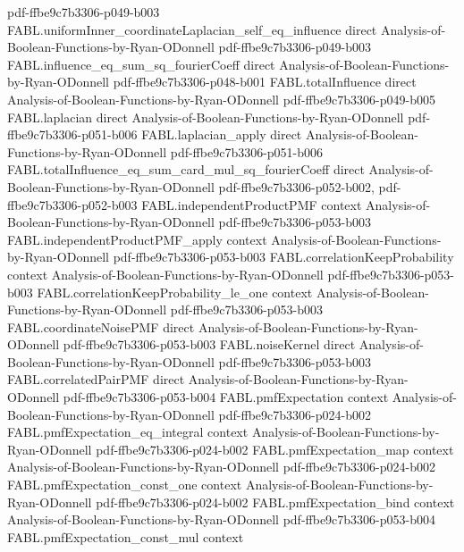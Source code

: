 \begin{theorem}
  {pdf-ffbe9c7b3306-p049-b003}
\proofstep
  {FABL.uniformInner_coordinateLaplacian_self_eq_influence}
  {direct}
  {Analysis-of-Boolean-Functions-by-Ryan-ODonnell}
  {pdf-ffbe9c7b3306-p049-b003}
\proofstep
  {FABL.influence_eq_sum_sq_fourierCoeff}
  {direct}
  {Analysis-of-Boolean-Functions-by-Ryan-ODonnell}
  {pdf-ffbe9c7b3306-p048-b001}
\proofstep
  {FABL.totalInfluence}
  {direct}
  {Analysis-of-Boolean-Functions-by-Ryan-ODonnell}
  {pdf-ffbe9c7b3306-p049-b005}
\proofstep
  {FABL.laplacian}
  {direct}
  {Analysis-of-Boolean-Functions-by-Ryan-ODonnell}
  {pdf-ffbe9c7b3306-p051-b006}
\proofstep
  {FABL.laplacian_apply}
  {direct}
  {Analysis-of-Boolean-Functions-by-Ryan-ODonnell}
  {pdf-ffbe9c7b3306-p051-b006}
\proofstep
  {FABL.totalInfluence_eq_sum_card_mul_sq_fourierCoeff}
  {direct}
  {Analysis-of-Boolean-Functions-by-Ryan-ODonnell}
  {pdf-ffbe9c7b3306-p052-b002,
    pdf-ffbe9c7b3306-p052-b003}
\proofstep
  {FABL.independentProductPMF}
  {context}
  {Analysis-of-Boolean-Functions-by-Ryan-ODonnell}
  {pdf-ffbe9c7b3306-p053-b003}
\proofstep
  {FABL.independentProductPMF_apply}
  {context}
  {Analysis-of-Boolean-Functions-by-Ryan-ODonnell}
  {pdf-ffbe9c7b3306-p053-b003}
\proofstep
  {FABL.correlationKeepProbability}
  {context}
  {Analysis-of-Boolean-Functions-by-Ryan-ODonnell}
  {pdf-ffbe9c7b3306-p053-b003}
\proofstep
  {FABL.correlationKeepProbability_le_one}
  {context}
  {Analysis-of-Boolean-Functions-by-Ryan-ODonnell}
  {pdf-ffbe9c7b3306-p053-b003}
\proofstep
  {FABL.coordinateNoisePMF}
  {direct}
  {Analysis-of-Boolean-Functions-by-Ryan-ODonnell}
  {pdf-ffbe9c7b3306-p053-b003}
\proofstep
  {FABL.noiseKernel}
  {direct}
  {Analysis-of-Boolean-Functions-by-Ryan-ODonnell}
  {pdf-ffbe9c7b3306-p053-b003}
\proofstep
  {FABL.correlatedPairPMF}
  {direct}
  {Analysis-of-Boolean-Functions-by-Ryan-ODonnell}
  {pdf-ffbe9c7b3306-p053-b004}
\proofstep
  {FABL.pmfExpectation}
  {context}
  {Analysis-of-Boolean-Functions-by-Ryan-ODonnell}
  {pdf-ffbe9c7b3306-p024-b002}
\proofstep
  {FABL.pmfExpectation_eq_integral}
  {context}
  {Analysis-of-Boolean-Functions-by-Ryan-ODonnell}
  {pdf-ffbe9c7b3306-p024-b002}
\proofstep
  {FABL.pmfExpectation_map}
  {context}
  {Analysis-of-Boolean-Functions-by-Ryan-ODonnell}
  {pdf-ffbe9c7b3306-p024-b002}
\proofstep
  {FABL.pmfExpectation_const_one}
  {context}
  {Analysis-of-Boolean-Functions-by-Ryan-ODonnell}
  {pdf-ffbe9c7b3306-p024-b002}
\proofstep
  {FABL.pmfExpectation_bind}
  {context}
  {Analysis-of-Boolean-Functions-by-Ryan-ODonnell}
  {pdf-ffbe9c7b3306-p053-b004}
\proofstep
  {FABL.pmfExpectation_const_mul}
  {context}

\end{theorem}
